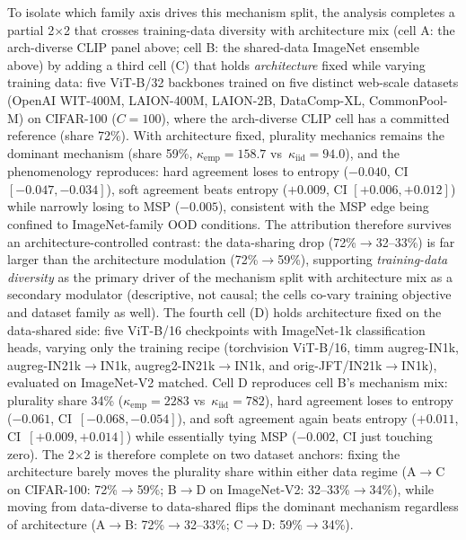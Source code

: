 \documentclass[a4paper,fleqn]{cas-sc}
\begin{document}
To isolate which family axis drives this mechanism split, the analysis completes a partial 2$\times$2 that crosses training-data diversity with architecture mix (cell A: the arch-diverse CLIP panel above; cell B: the shared-data ImageNet ensemble above) by adding a third cell (C) that holds \emph{architecture} fixed while varying training data: five ViT-B/32 backbones trained on five distinct web-scale datasets (OpenAI WIT-400M, LAION-400M, LAION-2B, DataComp-XL, CommonPool-M) on CIFAR-100 ($C{=}100$), where the arch-diverse CLIP cell has a committed reference (share 72\%).
With architecture fixed, plurality mechanics remains the dominant mechanism (share 59\%, $\kappa_{\text{emp}}=158.7$ vs~$\kappa_{\text{iid}}=94.0$), and the phenomenology reproduces: hard agreement loses to entropy ($-0.040$, CI $[-0.047,-0.034]$), soft agreement beats entropy ($+0.009$, CI $[+0.006,+0.012]$) while narrowly losing to MSP ($-0.005$), consistent with the MSP edge being confined to ImageNet-family OOD conditions.
The attribution therefore survives an architecture-controlled contrast: the data-sharing drop (72\%$\rightarrow$32--33\%) is far larger than the architecture modulation (72\%$\rightarrow$59\%), supporting \emph{training-data diversity} as the primary driver of the mechanism split with architecture mix as a secondary modulator (descriptive, not causal; the cells co-vary training objective and dataset family as well).
The fourth cell (D) holds architecture fixed on the data-shared side: five ViT-B/16 checkpoints with ImageNet-1k classification heads, varying only the training recipe (torchvision ViT-B/16, timm augreg-IN1k, augreg-IN21k$\rightarrow$IN1k, augreg2-IN21k$\rightarrow$IN1k, and orig-JFT/IN21k$\rightarrow$IN1k), evaluated on ImageNet-V2 matched.
Cell D reproduces cell B's mechanism mix: plurality share 34\% ($\kappa_{\text{emp}}=2283$ vs~$\kappa_{\text{iid}}=782$), hard agreement loses to entropy ($-0.061$, CI~$[-0.068,-0.054]$), and soft agreement again beats entropy ($+0.011$, CI~$[+0.009,+0.014]$) while essentially tying MSP ($-0.002$, CI just touching zero).
The 2$\times$2 is therefore complete on two dataset anchors: fixing the architecture barely moves the plurality share within either data regime (A$\rightarrow$C on CIFAR-100: 72\%$\rightarrow$59\%; B$\rightarrow$D on ImageNet-V2: 32--33\%$\rightarrow$34\%), while moving from data-diverse to data-shared flips the dominant mechanism regardless of architecture (A$\rightarrow$B: 72\%$\rightarrow$32--33\%; C$\rightarrow$D: 59\%$\rightarrow$34\%).
\end{document}
